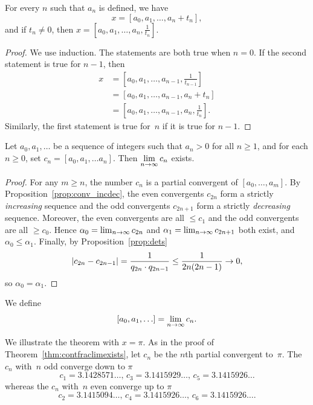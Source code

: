 \begin{lemma}\label{lem:cf1}
For every $n$ such that $a_n$ is defined, we have
$$x = [a_0, a_1, \ldots, a_{n}+t_n],$$
and if $t_{n}\neq 0$, then
$
  x = [a_0, a_1, \ldots, a_{n}, \frac{1}{t_n}].
$
\end{lemma}
\begin{proof}
We use induction.  The statements are both true when $n=0$.
If the second statement is true for $n-1$, then
\begin{align*}
x &= \left[a_0,a_1, \ldots, a_{n-1},\frac{1}{t_{n-1}}\right]\\
  &=\left[a_0,a_1, \ldots, a_{n-1},a_n + t_n\right]\\
  &=\left[a_0,a_1, \ldots, a_{n-1},a_n, \frac{1}{t_n}\right].
\end{align*}
Similarly, the first statement is true for~$n$ if
it is true for $n-1$.
\end{proof}


\begin{theorem}
\label{thm:contfraclimexists}
Let $a_0, a_1, \ldots $ be a sequence of integers
such that $a_n > 0$ for all $n\geq 1$,
and for each $n\geq 0$, set
$c_n = [a_0, a_1, \ldots a_n].$
Then $\displaystyle\lim_{n\rightarrow \infty} c_n$ exists.
\end{theorem}
\begin{proof}
  For any $m\geq n$, the number $c_n$ is a partial convergent of
  $[a_0, \ldots, a_m]$.  By Proposition~\ref{prop:conv_incdec}, the
  even convergents $c_{2n}$ form a strictly {\em increasing} sequence
  and the odd convergents $c_{2n+1}$ form a strictly {\em decreasing}
  sequence. Moreover, the even convergents are all $\leq c_1$ and the
  odd convergents are all $\geq c_0$.  Hence $\alpha_0 = \lim_{n\rightarrow
    \infty} c_{2n}$ and $\alpha_1 = \lim_{n\rightarrow \infty} c_{2n+1}$ both
  exist, and $\alpha_0\leq \alpha_1$.  Finally, by
  Proposition~\ref{prop:dets}
  $$
  |c_{2n} - c_{2n-1}| = \frac{1}{q_{2n}\cdot q_{2n-1}} \leq
  \frac{1}{2n(2n-1)} \rightarrow 0,
   $$
   so $\alpha_0 = \alpha_1$.
\end{proof}

We define
$$
[a_0, a_1, \ldots ] = \lim_{n\rightarrow \infty} c_n.
$$

\begin{example}
We illustrate the theorem with $x=\pi$.
As in the proof of Theorem~\ref{thm:contfraclimexists},
let $c_n$ be the $n$th partial convergent
to~$\pi$. The $c_n$ with~$n$ odd converge down to $\pi$
$$ c_1 = 3.1428571\ldots, \,c_3 = 3.1415929\ldots, \,c_5=3.1415926\ldots$$
whereas the $c_n$ with~$n$ even converge up to $\pi$
$$ c_2 = 3.1415094\ldots, \,c_4 = 3.1415926\ldots,\, c_6=3.1415926\ldots.$$
\end{example}

